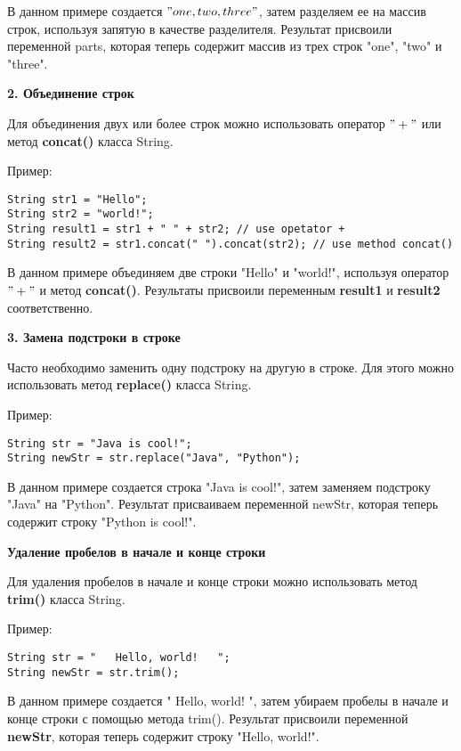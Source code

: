 \documentclass[12pt, a4paper]{book}%
\begin{document}
{В данном примере создается $"one,two,three"$, затем разделяем ее на массив строк, используя запятую в качестве разделителя. Результат присвоили переменной parts, которая теперь содержит массив из трех строк "one", "two" и "three".

{\bf 2. Объединение строк}

Для объединения двух или более строк можно использовать оператор $"+"$ или метод {\bf concat()} класса String. 

Пример:

\begin{lstlisting}
String str1 = "Hello";
String str2 = "world!";
String result1 = str1 + " " + str2; // use opetator +
String result2 = str1.concat(" ").concat(str2); // use method concat()
\end{lstlisting}

В данном примере объединяем две строки "Hello" и "world!", используя оператор $"+"$ и метод {\bf concat()}. Результаты присвоили переменным {\bf result1} и {\bf result2} соответственно.

{\bf 3. Замена подстроки в строке}

Часто необходимо заменить одну подстроку на другую в строке. Для этого можно использовать метод {\bf replace()} класса String. 

\newpage
Пример:

\begin{lstlisting}
String str = "Java is cool!";
String newStr = str.replace("Java", "Python");
\end{lstlisting}

В данном примере создается строка "Java is cool!", затем заменяем подстроку "Java" на "Python". Результат присваиваем переменной newStr, которая теперь содержит строку "Python is cool!".

{\bf Удаление пробелов в начале и конце строки}

Для удаления пробелов в начале и конце строки можно использовать метод {\bf trim()} класса String. 

Пример:

\begin{lstlisting}
String str = "   Hello, world!   ";
String newStr = str.trim();
\end{lstlisting}

В данном примере создается " Hello, world! ", затем убираем пробелы в начале и конце строки с помощью метода trim(). Результат присвоили переменной {\bf newStr}, которая теперь содержит строку "Hello, world!".

}
\end{document}
